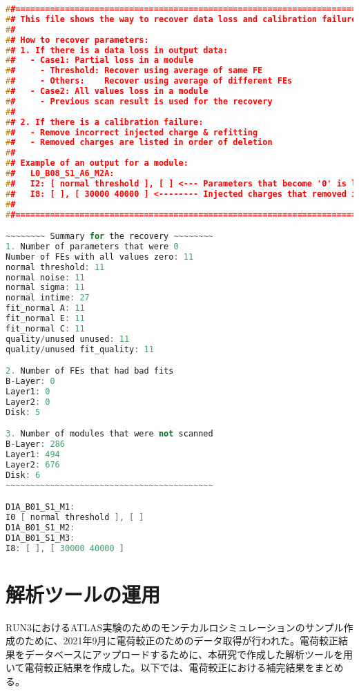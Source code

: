 \begin{lstlisting}[caption=解析ツールにより出力される補完結果のまとめ,label=code:matomefile, language=C++]
##===========================================================================
## This file shows the way to recover data loss and calibration failure.
##
## How to recover parameters:
## 1. If there is a data loss in output data:
##   - Case1: Partial loss in a module
##     - Threshold: Recover using average of same FE
##     - Others:    Recover using average of different FEs
##   - Case2: All values loss in a module
##     - Previous scan result is used for the recovery
##
## 2. If there is a calibration failure:
##   - Remove incorrect injected charge & refitting
##   - Removed charges are listed in order of deletion
##
## Example of an output for a module:
##   L0_B08_S1_A6_M2A:
##   I2: [ normal threshold ], [ ] <--- Parameters that become '0' is listed
##   I8: [ ], [ 30000 40000 ] <-------- Injected charges that removed is listed
##
##===========================================================================

~~~~~~~~ Summary for the recovery ~~~~~~~~
1. Number of parameters that were 0
Number of FEs with all values zero: 11
normal threshold: 11
normal noise: 11
normal sigma: 11
normal intime: 27
fit_normal A: 11
fit_normal E: 11
fit_normal C: 11
quality/unused unused: 11
quality/unused fit_quality: 11

2. Number of FEs that had bad fits
B-Layer: 0
Layer1: 0
Layer2: 0
Disk: 5

3. Number of modules that were not scanned
B-Layer: 286
Layer1: 494
Layer2: 676
Disk: 6
~~~~~~~~~~~~~~~~~~~~~~~~~~~~~~~~~~~~~~~~~~

D1A_B01_S1_M1:
I0 [ normal threshold ], [ ]
D1A_B01_S1_M2:
D1A_B01_S1_M3:
I8: [ ], [ 30000 40000 ]
\end{lstlisting}



\section{解析ツールの運用}
\label{sec:unnyou}

RUN3におけるATLAS実験のためのモンテカルロシミュレーションのサンプル作成のために、2021年9月に電荷較正のためのデータ取得が行われた。電荷較正結果をデータベースにアップロードするために、本研究で作成した解析ツールを用いて電荷較正結果を作成した。以下では、電荷較正における補完結果をまとめる。


